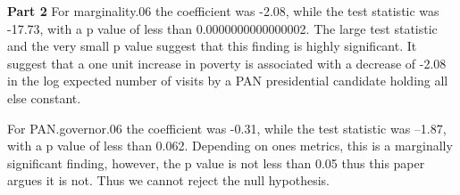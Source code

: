 \documentclass[12pt,letterpaper]{article}
\begin{document}
	\textbf{Part 2}
	For marginality.06 the coefficient was -2.08, while the test statistic was -17.73, with a p value of less than 0.0000000000000002. The large test statistic and the very small p value suggest that this finding is highly significant.  It suggest that a one unit increase in poverty is associated with a decrease of -2.08 in the log expected number of visits by a PAN presidential candidate holding all else constant.
	
	For PAN.governor.06 the coefficient was -0.31, while the test statistic was --1.87, with a p value of less than 0.062. Depending on ones metrics, this is a marginally significant finding, however, the p value is not less than 0.05 thus this paper argues it is not. Thus we cannot reject the null hypothesis.
	
	
\end{document}
